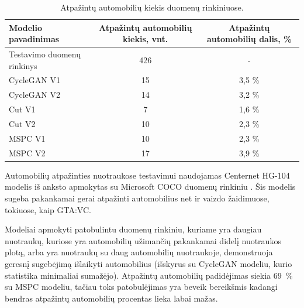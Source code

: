 \documentclass{VUMIFPSbakalaurinis}
\begin{document}
            \begin{table}[H]
                \footnotesize
                \centering
                \caption{Atpažintų automobilių kiekis duomenų rinkiniuose.}
                {\begin{tabular}{|l|c|c|} \hline
                    Modelio pavadinimas & Atpažintų automobilių kiekis, vnt. & Atpažintų automobilių dalis, \% \\
                    \hline
                    Testavimo duomenų rinkinys & 426 & - \\
                    CycleGAN V1 & 15 & 3,5 \% \\
                    CycleGAN V2 & 14 & 3,2 \% \\
                    Cut V1 & 7 & 1,6 \% \\
                    Cut V2 & 10 & 2,3 \% \\ 
                    MSPC V1 & 10 & 2,3 \% \\
                    MSPC V2 & 17 & 3,9 \% \\
                    \hline
                    \end{tabular}
                }
                \label{tab:car_stats}
            \end{table}
            
            Automobilių atpažinties nuotraukose testavimui naudojamas Centernet HG-104 \cite{CenterNet} modelis iš anksto apmokytas su Microsoft COCO duomenų rinkiniu \cite{CocoDataset}. Šis modelis sugeba pakankamai gerai atpažinti automobilius net ir vaizdo žaidimuose, tokiuose, kaip GTA:VC.
            
            Modeliai apmokyti patobulintu duomenų rinkiniu, kuriame yra daugiau nuotraukų, kuriose yra automobilių užimančių pakankamai didelį nuotraukos plotą, arba yra nuotraukų su daug automobilių nuotraukoje, demonstruoja geresnį sugebėjimą išlaikyti automobilius (išskyrus su CycleGAN modeliu, kurio statistika minimaliai sumažėjo). Atpažintų automobilių padidėjimas siekia 69~\% su MSPC modeliu, tačiau toks patobulėjimas yra beveik bereikšmis kadangi bendras atpažintų automobilių procentas lieka labai mažas.
             
\end{document}
